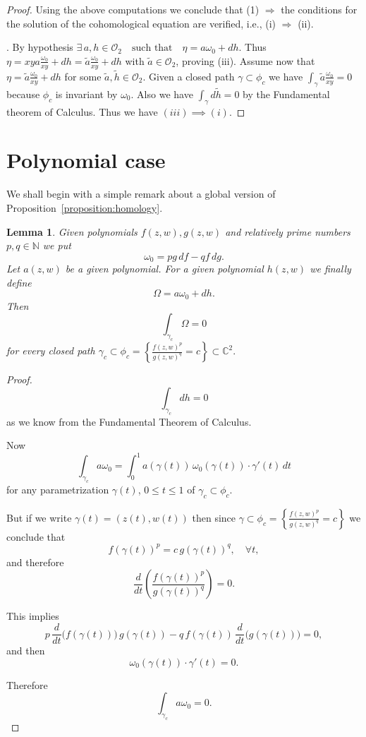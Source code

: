\documentclass[11pt,a4paper]{amsart}
\newtheorem{lemma}[theorem]{Lemma}
\theoremstyle{definition}
\begin{document}
\begin{proof}
Using the above computations we conclude that
(1) $\Rightarrow$ the conditions for the solution
of the cohomological equation are verified,
i.e., (i) $\Rightarrow$ (ii). 


. 
By hypothesis  $\exists\, a,h\in\mathcal{O}_2
\quad \text{such that}
\quad
\eta=a\omega_0+dh.
$
Thus $\eta=xya\frac{\omega_0}{xy}+dh=\tilde a\frac{\omega_0}{xy}+dh$ with $\tilde a \in \mathcal O_2$, proving (iii). 
Assume now that $\eta=\tilde a\frac{\omega_0}{xy}+dh$ for some $\tilde a ,\tilde h \in \mathcal O_2$. 
Given a closed path $\gamma \subset \phi_c$ we have $\int_\gamma \tilde a \frac{\omega_0}{xy} =0$ because $\phi_c$ is invariant by $\omega_0$. Also we have $\int_\gamma d\tilde h =0$ by the Fundamental theorem of Calculus. 
Thus we have $(iii) \implies (i)$. 
\end{proof}




\section{Polynomial case}
\label{section:polyncase}


We shall begin with a simple remark about a global version of Proposition~\ref{proposition:homology}.

\begin{lemma}
\label{lemma:homologyglobal}
Given polynomials $f(z,w),g(z,w)$ and relatively prime numbers
$p,q\in\mathbb{N}$ we put
\[
\omega_0 = p g\,df - q f\,dg.
\]
Let $a(z,w)$ be a given polynomial.
For a given polynomial $h(z,w)$ we finally define
\[
\Omega = a \omega_0 + dh.
\]
Then
\[
\int_{\gamma_c}\Omega = 0
\]
for every closed path $\gamma_c \subset \phi_c
=
\left\{\frac{f(z,w)^p}{g(z,w)^q}=c\right\}
\subset \mathbb{C}^2.
$
\end{lemma}
\begin{proof}
\[
\int_{\gamma_c} dh = 0
\]
as we know from the Fundamental Theorem of Calculus.

Now
\[
\int_{\gamma_c} a \omega_0
=
\int_0^1
a(\gamma(t))\, \omega_0(\gamma(t))\cdot \gamma'(t)\, dt
\]
for any parametrization $\gamma(t)$, $0\le t\le1$ of $\gamma_c\subset\phi_c$.

But if we write $\gamma(t)=(z(t),w(t))$
then since $\gamma\subset\phi_c
=
\left\{\frac{f(z,w)^p}{g(z,w)^q}=c\right\}$
we conclude that
\[
f(\gamma(t))^p = c\, g(\gamma(t))^q,
\quad \forall t,
\]
and therefore
\[
\frac{d}{dt}
\left(
\frac{f(\gamma(t))^p}{g(\gamma(t))^q}
\right)=0.
\]

This implies
\[
p\,\frac{d}{dt}\big(f(\gamma(t))\big)\,g(\gamma(t))
-
q\,f(\gamma(t))\,\frac{d}{dt}\big(g(\gamma(t))\big)
=0,
\]
and then
\[
\omega_0(\gamma(t))\cdot \gamma'(t)=0.
\]

Therefore
\[
\int_{\gamma_c} a \omega_0 = 0.
\]
\end{proof}
\end{document}
